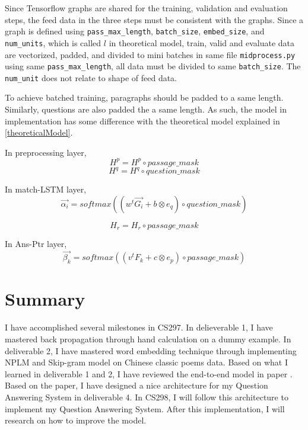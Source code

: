 \documentclass[12pt]{article}
\begin{document}
Since Tensorflow graphs are shared for the training, validation and evaluation steps, the feed data in the three steps must be consistent with the graphs. Since a graph is defined using \texttt{pass\_max\_length}, \texttt{batch\_size}, \texttt{embed\_size}, and \texttt{num\_units}, which is called $l$ in theoretical model, train, valid and evaluate data are vectorized, padded, and divided to mini batches in same file \texttt{midprocess.py} using same \texttt{pass\_max\_length}, all data must be divided to same \texttt{batch\_size}. The \texttt{num\_unit} does not relate to shape of feed data.


To achieve batched training, paragraphs should be padded to a same length. Similarly, questions are also padded the a same length. As such, the model in implementation has some difference with the theoretical model explained in \ref{theoreticalModel}.

In preprocessing layer,
$$H^p = H^p \circ passage\_mask$$
$$H^q = H^q \circ question\_mask$$

In match-LSTM layer,
$$\overrightarrow{\alpha _i} = softmax( (w^t\overrightarrow{G_i} + b \otimes e_q) \circ question\_mask)$$


$$H_r = H_r \circ passage\_mask$$

In Ans-Ptr layer,
$$\overrightarrow{\beta _k} = softmax( (v^tF_k + c \otimes e_p) \circ passage\_mask)$$

\break

\section{Summary}\label{sec:summary}

I have accomplished several milestones in CS297. In delieverable 1, I have mastered back propagation through hand calculation on a dummy example. In deliverable 2, I have mastered word embedding technique through implementing NPLM and Skip-gram model on Chinese classic poems data. Based on what I learned in deliverable 1 and 2, I have reviewed the end-to-end model in paper \cite{wang2016machine}. Based on the paper, I have designed a nice architecture for my Question Answering System in deliverable 4. In CS298, I will follow this architecture to implement my Question Answering System. After this implementation, I will research on how to improve the model.

\break



\printbibliography[heading=bibintoc,title={References}]
\end{document}
